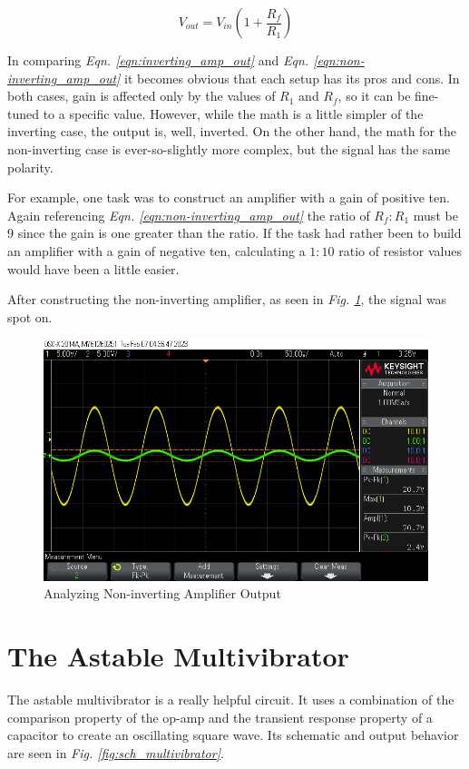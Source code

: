 \documentclass[journal]{IEEEtran}
\begin{document}
\begin{equation}
    V_{out} = V_{in}\left(1 + \frac{R_f}{R_1}\right)
    \label{eqn:non-inverting_amp_out}
\end{equation}

In comparing \textit{Eqn. \ref{eqn:inverting_amp_out}} and \textit{Eqn. \ref{eqn:non-inverting_amp_out}} it becomes obvious that each setup has its pros and cons. In both cases, gain is affected only by the values of $R_1$ and $R_f$, so it can be fine-tuned to a specific value. However, while the math is a little simpler of the inverting case, the output is, well, inverted. On the other hand, the math for the non-inverting case is ever-so-slightly more complex, but the signal has the same polarity.

For example, one task was to construct an amplifier with a gain of positive ten. Again referencing \textit{Eqn. \ref{eqn:non-inverting_amp_out}} the ratio of $R_f:R_1$ must be 9 since the gain is one greater than the ratio. If the task had rather been to build an amplifier with a gain of negative ten, calculating a $1:10$ ratio of resistor values would have been a little easier.

After constructing the non-inverting amplifier, as seen in \textit{Fig. \ref{fig:osc_non-inverting}}, the signal was spot on.

\begin{figure}[h]
    \includegraphics[scale=0.3]{Media/wiggle_10x.png}
    \caption[short]{Analyzing Non-inverting Amplifier Output}
    \label{fig:osc_non-inverting}
\end{figure}

\section{The Astable Multivibrator}
The astable multivibrator is a really helpful circuit. It uses a combination of the comparison property of the op-amp and the transient response property of a capacitor to create an oscillating square wave. Its schematic and output behavior are seen in \textit{Fig. \ref{fig:sch_multivibrator}}.
\end{document}
